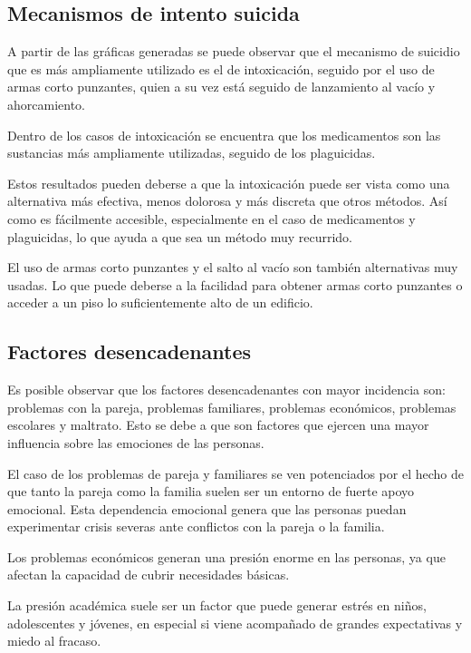 \documentclass[
]{article}
\begin{document}
\subsection{Mecanismos de intento
suicida}\label{mecanismos-de-intento-suicida-1}

A partir de las gráficas generadas se puede observar que el mecanismo de
suicidio que es más ampliamente utilizado es el de intoxicación, seguido
por el uso de armas corto punzantes, quien a su vez está seguido de
lanzamiento al vacío y ahorcamiento.

Dentro de los casos de intoxicación se encuentra que los medicamentos
son las sustancias más ampliamente utilizadas, seguido de los
plaguicidas.

Estos resultados pueden deberse a que la intoxicación puede ser vista
como una alternativa más efectiva, menos dolorosa y más discreta que
otros métodos. Así como es fácilmente accesible, especialmente en el
caso de medicamentos y plaguicidas, lo que ayuda a que sea un método muy
recurrido.

El uso de armas corto punzantes y el salto al vacío son también
alternativas muy usadas. Lo que puede deberse a la facilidad para
obtener armas corto punzantes o acceder a un piso lo suficientemente
alto de un edificio.

\subsection{Factores desencadenantes}\label{factores-desencadenantes-1}

Es posible observar que los factores desencadenantes con mayor
incidencia son: problemas con la pareja, problemas familiares, problemas
económicos, problemas escolares y maltrato. Esto se debe a que son
factores que ejercen una mayor influencia sobre las emociones de las
personas.

El caso de los problemas de pareja y familiares se ven potenciados por
el hecho de que tanto la pareja como la familia suelen ser un entorno de
fuerte apoyo emocional. Esta dependencia emocional genera que las
personas puedan experimentar crisis severas ante conflictos con la
pareja o la familia.

Los problemas económicos generan una presión enorme en las personas, ya
que afectan la capacidad de cubrir necesidades básicas.

La presión académica suele ser un factor que puede generar estrés en
niños, adolescentes y jóvenes, en especial si viene acompañado de
grandes expectativas y miedo al fracaso.
\end{document}
